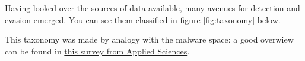 Having looked over the sources of data available, many avenues for detection and evasion emerged.
You can see them classified in figure \ref{fig:taxonomy} below.

This taxonomy was made by analogy with the malware space: a good overwiew can be found in \href{\urlpapermalwaresurvey}{this survey from Applied Sciences}.
